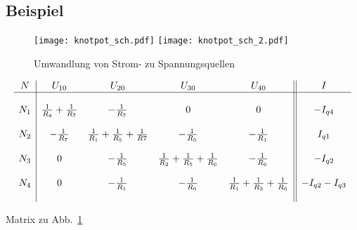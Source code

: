 \newpage
\subsection{Beispiel}

\begin{figure}[h!]
\centering
\texttt{[image: knotpot\_sch.pdf]}
\texttt{[image: knotpot\_sch\_2.pdf]}
\caption{Umwandlung von Strom- zu Spannungsquellen}
\label{sch:knotpot_2}
\end{figure}

\begin{table}[h!]
\footnotesize
\[ 	\begin{array}{c|cccc||c}
	N & U_{10}						& U_{20}										& U_{30} 											& U_{40} 											& I \\
	\hline &&&&& \\
	N_1	& \frac{1}{R_4} + \frac{1}{R_7}		& -\frac{1}{R_7} 								& 0 												& 0 												& -I_{q4} 			\\
	&&&&& \\
	N_2	& -\frac{1}{R_7} 					& \frac{1}{R_1} + \frac{1}{R_5} + \frac{1}{R7} 	& -\frac{1}{R_5} 									& -\frac{1}{R_1} 									& I_{q1} 			\\ 
	&&&&& \\
	N_3	& 0 								& -\frac{1}{R_5} 								& \frac{1}{R_2} + \frac{1}{R_5} + \frac{1}{R_6} 	& -\frac{1}{R_6} 									& -I_{q2} 			\\ 
	&&&&& \\
	N_4 & 0 								& -\frac{1}{R_1} 								& -\frac{1}{R_6} 									& \frac{1}{R_1} + \frac{1}{R_3} + \frac{1}{R_6} 	& -I_{q2} -I_{q3} 	\\ 
	&&&&& \\
	\end{array}
\]
\normalsize
\caption{Matrix zu Abb.~\ref{sch:knotpot_2}}
\end{table}

\newpage
